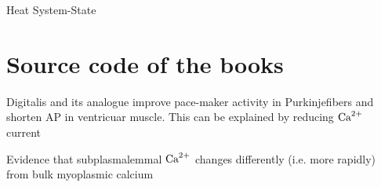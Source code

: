 \documentclass[11pt]{book}
\begin{document}
{Heat}
{System-State}


\part{Source code of the books}
\label{chap:source-code-books}




Digitalis and its analogue improve pace-maker activity in Purkinjefibers and
shorten AP in ventricuar muscle. This can be explained by reducing ${\text{Ca}^{2+}}$ current

Evidence that subplasmalemmal ${\text{Ca}^{2+}}$ changes differently (i.e. more rapidly) from
bulk myoplasmic calcium \citep{etter1994, himpens1994,stehno_bittel1994}

\backmatter 
 
\printindex %



 
\end{document}

